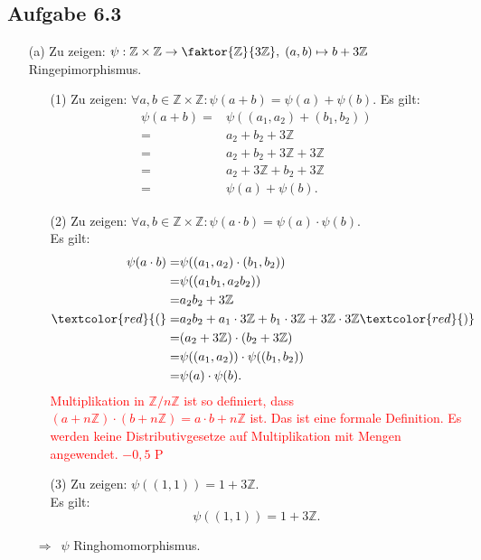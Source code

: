 \documentclass[12pt]{article}
\newcommand{\corr}[1]{\textcolor{red}{#1}}
\newcommand{\df}{\enspace\Longrightarrow\enspace}
\begin{document}
\subsection*{Aufgabe 6.3}
\begin{enumerate}
	\item[(a)] Zu zeigen: $\psi:\mathbb{Z}\times\mathbb{Z}\rightarrow\faktor{\mathbb{Z}}{3\mathbb{Z}},\;(a,b)\mapsto b+3\mathbb{Z}$ Ringepimorphismus. \\
	\begin{enumerate}
		\item[(1)] Zu zeigen: $\forall a,b\in \mathbb{Z}\times\mathbb{Z}: \psi(a+b)=\psi(a)+\psi(b)$.
		Es gilt:
		\begin{align*}
			\psi(a+b) = &\psi((a_1,a_2)+(b_1,b_2)) \\
			= &a_2+b_2+3\mathbb{Z} \\
			= &a_2+b_2+3\mathbb{Z}+3\mathbb{Z} \\
			= &a_2+3\mathbb{Z}+b_2+3\mathbb{Z} \\
			= &\psi(a)+\psi(b).
		\end{align*}
		
		\item[(2)] Zu zeigen: $\forall a,b\in \mathbb{Z}\times\mathbb{Z}: \psi(a\cdot b)=\psi(a)\cdot\psi(b)$. \\
		Es gilt:
		\begin{align*}
			\psi(a\cdot b) = &\psi((a_1,a_2)\cdot(b_1,b_2)) \\
			= &\psi((a_1b_1,a_2b_2)) \\
			= &a_2b_2+3\mathbb{Z} \\
			\corr{(}= &a_2b_2+a_1\cdot 3\mathbb{Z}+b_1\cdot 3\mathbb{Z} + 3\mathbb{Z}\cdot 3\mathbb{Z} \corr{)}\\
			= &(a_2 + 3\mathbb{Z})\cdot(b_2+3\mathbb{Z}) \\
			= &\psi((a_1,a_2))\cdot\psi((b_1,b_2)) \\
			= &\psi(a)\cdot\psi(b).
		\end{align*}
\corr{Multiplikation in $\mathbb{Z}/n\mathbb{Z}$ ist so definiert, dass $(a+n\mathbb{Z})\cdot(b+n\mathbb{Z})=a\cdot b+n \mathbb{Z}$ ist. Das ist eine formale Definition. Es werden keine Distributivgesetze auf Multiplikation mit Mengen angewendet. $-0,5$ P}
		
		\item[(3)] Zu zeigen: $\psi((1,1))=1+3\mathbb{Z}$. \\
		Es gilt:
		$$\psi((1,1)) = 1+3\mathbb{Z}.$$	
	\end{enumerate}
	$\df \psi$ Ringhomomorphismus.
	

\end{enumerate}
\end{document}
